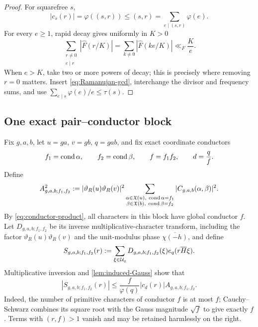 \begin{proof}
For squarefree \(s\),
\begin{equation}
 |c_s(r)|=\varphi((s,r))
 \le(s,r)=\sum_{e\mid(s,r)}\varphi(e).
 \label{eq:Ramanujan-gcd}
\end{equation}
For every \(e\ge1\), rapid decay gives uniformly in \(K>0\)
\begin{equation}
 \sum_{\substack{r\ne0\\e\mid r}}|\widehat F(r/K)|
 =\sum_{k\ne0}|\widehat F(ke/K)|
 \ll_F \frac Ke.
 \label{eq:Fourier-multiples}
\end{equation}
When \(e>K\), take two or more powers of decay; this is precisely where
removing \(r=0\) matters.  Insert \eqref{eq:Ramanujan-gcd}, interchange
the divisor and frequency sums, and use
\(\sum_{e\mid s}\varphi(e)/e\le\tau(s)\).
\end{proof}

\subsection{One exact pair--conductor block}

Fix \(g,a,b\), let \(u=ga\), \(v=gb\), \(q=gab\), and fix exact
coordinate conductors
\begin{equation}
 f_1=\operatorname{cond}\alpha,\qquad f_2=\operatorname{cond}\beta,\qquad
 f=f_1f_2,\qquad d=\frac qf.
 \label{eq:exact-coordinate-conductors}
\end{equation}
Define
\begin{equation}
 A_{g,a,b;f_1,f_2}^2
 :=|\vartheta_R(u)\vartheta_R(v)|^2
 \sum_{\substack{\alpha\in\mathfrak X(u),\ \operatorname{cond}\alpha=f_1\\
                  \beta\in\mathfrak X(b),\ \operatorname{cond}\beta=f_2}}
 |C_{g,a,b}(\alpha,\beta)|^2.
 \label{eq:exact-block-amplitude}
\end{equation}
By \eqref{eq:conductor-product}, all characters in this block have
global conductor \(f\).  Let
\(D_{g,a,b;f_1,f_2}\) be its inverse multiplicative-character transform,
including the factor \(\vartheta_R(u)\vartheta_R(v)\) and the
unit-modulus phase \(\overline{\chi(-h)}\), and define
\begin{equation}
 S_{g,a,b;f_1,f_2}(r)
 :=\sum_{\xi\in\mathcal U_q}D_{g,a,b;f_1,f_2}(\xi)
 e_q(r\overline H\xi).
 \label{eq:exact-block-additive-transform}
\end{equation}
Multiplicative inversion and \cref{lem:induced-Gauss} show that
\begin{equation}
 |S_{g,a,b;f_1,f_2}(r)|
 \le \frac f{\varphi(q)}|c_d(r)|
 A_{g,a,b;f_1,f_2}.
 \label{eq:exact-block-S}
\end{equation}
Indeed, the number of primitive characters of conductor \(f\) is at
most \(f\); Cauchy--Schwarz combines its square root with the Gauss
magnitude \(\sqrt f\) to give exactly \(f\).  Terms with \((r,f)>1\)
vanish and may be retained harmlessly on the right.

